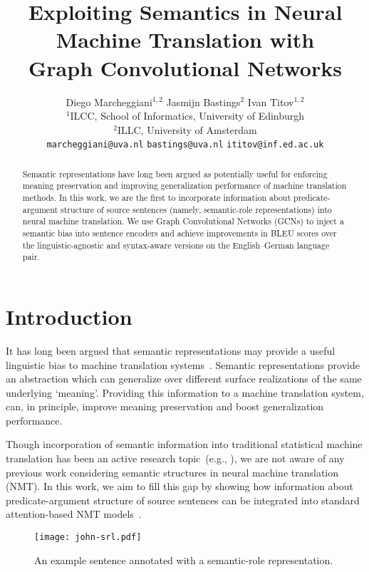 \documentclass[11pt,a4paper]{article}
\title{Exploiting Semantics in Neural Machine Translation with \\ Graph Convolutional Networks}
\author{
 Diego Marcheggiani$^{1,2}$ \hspace{1cm} Jasmijn Bastings$^{2}$\hspace{1cm} Ivan Titov$^{1,2}$    \\
 $^1$ILCC, School of Informatics, University of Edinburgh \\
 $^2$ILLC,  University of Amsterdam  \\
    {\tt marcheggiani@uva.nl} \hspace{0.3cm} {\tt bastings@uva.nl} \hspace{0.3cm} {\tt ititov@inf.ed.ac.uk}
 }
\date{}
\begin{document}
\maketitle
\begin{abstract}
  Semantic representations have long been argued as potentially useful for enforcing meaning preservation and improving generalization performance of machine translation methods. 
  In this work, we are the first to incorporate information about predicate-argument structure of source sentences (namely, semantic-role representations) into neural machine translation. We use Graph Convolutional Networks (GCNs) to inject a semantic bias into sentence encoders and achieve improvements in BLEU scores over the linguistic-agnostic and syntax-aware versions on the English--German language pair.  

\end{abstract}

\section{Introduction}

It has long been argued that semantic representations may provide a useful linguistic bias to machine translation systems~\cite{weaver1955translation,bar1960present}. Semantic
representations provide an abstraction which can generalize over different surface realizations of the same underlying `meaning'. 
Providing this information to a machine translation system, can, in principle, improve meaning preservation and boost generalization performance.

Though incorporation of semantic information into traditional statistical machine translation has been an active research topic~(e.g., \cite{baker-etal:2012:CL,DBLP:conf/coling/LiuG10,DBLP:conf/naacl/WuF09,DBLP:conf/acl/BazrafshanG13,DBLP:conf/wmt/AzizRS11,C12-1083}), we are not aware of any previous work considering semantic structures in neural machine translation (NMT). In this work, we aim to fill this gap by showing how information about predicate-argument structure of source sentences can be integrated into standard attention-based NMT models~\cite{bahdanau15iclr}.

\begin{figure}
\begin{center}
\texttt{[image: john-srl.pdf]}
\vspace{-3ex}
\caption{ 
An example sentence annotated with a semantic-role representation.
\label{fig:srl-example}} 
\vspace{-2.5ex}
\end{center}
\end{figure}
\end{document}
